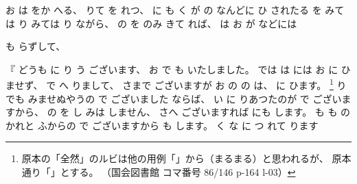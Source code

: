 %
お
は
をか
へる、
%
りて
を
れつ、
%
に
も
く
が
の
なんどに
ひ
されたる
を
みては
り
みては
り
ながら、
%
の
を
のみ
きて
れば、
%
は
お
が
などには

も
らずして、

%
『
どうも
に
り
う
ございます、
%
お
で
も
いたしました。
%
では
は
には
お
に
ひませず、
%
で
へ
%
りまして、
%
さまで
ございますが
お
の
の
は、
%
に
ひます。
%
\footnote{%
原本の「全然」のルビは他の用例「」から（まるまる）と思われるが、
原本通り「」とする。
（国会図書館 コマ番号 86/146 p-164 l-03）
}%
り
でも
みませぬやうの
で
ございました
ならば、
%
い
に
りあつたのが
で
ございますから、
%
の
を
し
みは
しません、
%
さへ
ございますれば
にも
します。
%
も
も
の
かれと
ふからの
で
ございますから
も
します。
%
く
な
に
%
つ
れて
ります
